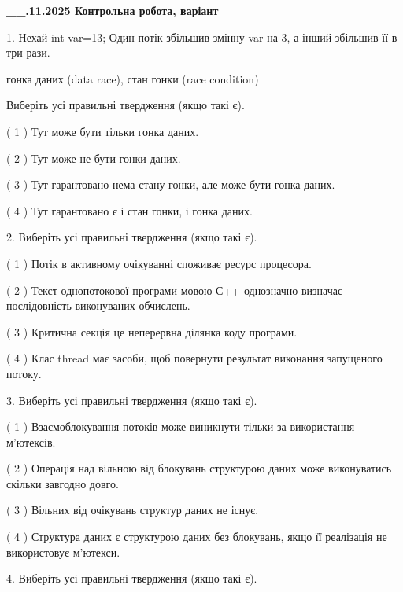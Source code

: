 \documentclass[12pt, ukrainian]{article}
\begin{document}
\newpage
\begin {large}

\textbf{\_\_.11.2025 Контрольна робота, варіант  }\par


{
1. Нехай int var=13; Один потік збільшив змінну var на 3, а інший збільшив її в три рази.

гонка даних (data race), стан гонки (race condition)

Виберіть усі правильні твердження (якщо такі є).\par
\vspace{2mm}
( 1 ) Тут може бути тільки гонка даних.%

( 2 ) Тут може не бути гонки даних.%

( 3 ) Тут гарантовано нема стану гонки, але може бути гонка даних.%

( 4 ) Тут гарантовано є і стан гонки, і гонка даних.%


2. Виберіть усі правильні твердження (якщо такі є).\par
\vspace{2mm}

( 1 ) Потік в активному очікуванні споживає ресурс процесора.%

( 2 ) Текст однопотокової програми мовою С++ однозначно визначає послідовність виконуваних обчислень.%

( 3 ) Критична секція це неперервна ділянка коду програми.%

( 4 ) Клас thread має засоби, щоб повернути результат виконання запущеного потоку.%


3. Виберіть усі правильні твердження (якщо такі є).\par
\vspace{2mm}

( 1 ) Взаємоблокування потоків може виникнути тільки за використання м’ютексів.%

( 2 ) Операція над вільною від блокувань структурою даних може виконуватись скільки завгодно довго.%

( 3 ) Вільних від очікувань структур даних не існує.%

( 4 ) Структура даних є структурою даних без блокувань, якщо її реалізація не використовує м’ютекси.%


4. Виберіть усі правильні твердження (якщо такі є).\par
\vspace{2mm}

}
\end{large}
\end{document}
